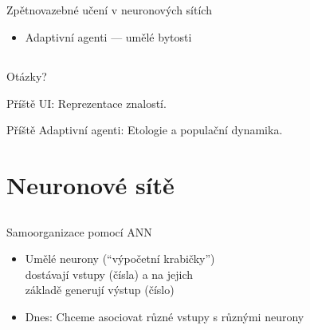 \documentclass{beamer}
\begin{document}
\subsection{}
\begin{frame}{Zpětnovazebné učení v neuronových sítích}
\begin{itemize}
\item Adaptivní agenti --- umělé bytosti
\end{itemize}
\end{frame}

\subsection{}
\begin{frame}{Otázky?}
\begin{center}
Příště UI: Reprezentace znalostí.

Příště Adaptivní agenti: Etologie a populační dynamika.
\end{center}
\end{frame}

\section{Neuronové sítě}

\subsection{}
\begin{frame}{Samoorganizace pomocí ANN}
\begin{itemize}
\item Umělé neurony (``výpočetní krabičky'') \\ dostávají vstupy (čísla) a na jejich \\ základě generují výstup (číslo)
\item Dnes: Chceme asociovat různé vstupy s různými neurony
\end{itemize}
\end{frame}
\end{document}
